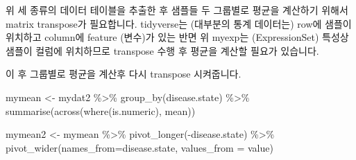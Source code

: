 \documentclass[
]{book}
\newenvironment{Shaded}{\begin{snugshade}}{\end{snugshade}}
\newcommand{\AttributeTok}[1]{\textcolor[rgb]{0.77,0.63,0.00}{#1}}
\newcommand{\DocumentationTok}[1]{\textcolor[rgb]{0.56,0.35,0.01}{\textbf{\textit{#1}}}}
\newcommand{\FunctionTok}[1]{\textcolor[rgb]{0.00,0.00,0.00}{#1}}
\newcommand{\NormalTok}[1]{#1}
\newcommand{\OtherTok}[1]{\textcolor[rgb]{0.56,0.35,0.01}{#1}}
\newcommand{\SpecialCharTok}[1]{\textcolor[rgb]{0.00,0.00,0.00}{#1}}
\newcommand{\StringTok}[1]{\textcolor[rgb]{0.31,0.60,0.02}{#1}}
\begin{document}
위 세 종류의 데이터 테이블을 추출한 후 샘플들 두 그룹별로 평균을 계산하기 위해서 matrix transpose가 필요합니다. tidyverse는 (대부분의 통계 데이터는) row에 샘플이 위치하고 column에 feature (변수)가 있는 반면 위 myexp는 (ExpressionSet) 특성상 샘플이 컬럼에 위치하므로 transpose 수행 후 평균을 계산할 필요가 있습니다.

\begin{Shaded}
\end{Shaded}

이 후 그룹별로 평균을 계산후 다시 transpose 시켜줍니다.

\begin{Shaded}
\begin{Highlighting}[]
\NormalTok{mymean }\OtherTok{\textless{}{-}}\NormalTok{ mydat2 }\SpecialCharTok{\%\textgreater{}\%} 
  \FunctionTok{group\_by}\NormalTok{(disease.state) }\SpecialCharTok{\%\textgreater{}\%} 
  \FunctionTok{summarise}\NormalTok{(}\FunctionTok{across}\NormalTok{(}\FunctionTok{where}\NormalTok{(is.numeric), mean))}

\NormalTok{mymean2 }\OtherTok{\textless{}{-}}\NormalTok{ mymean }\SpecialCharTok{\%\textgreater{}\%} 
  \FunctionTok{pivot\_longer}\NormalTok{(}\SpecialCharTok{{-}}\NormalTok{disease.state) }\SpecialCharTok{\%\textgreater{}\%} 
  \FunctionTok{pivot\_wider}\NormalTok{(}\AttributeTok{names\_from=}\NormalTok{disease.state, }\AttributeTok{values\_from =}\NormalTok{ value)}
\end{Highlighting}
\end{Shaded}
\end{document}
